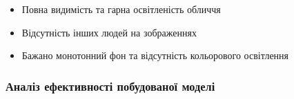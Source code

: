 \documentclass[11pt]{article}
\providecommand{\tightlist}{%
      \setlength{\itemsep}{0pt}\setlength{\parskip}{0pt}}
\begin{document}
\begin{itemize}
\tightlist
\item
  Повна видимість та гарна освітленість обличчя
\item
  Відсутність інших людей на зображеннях
\item
  Бажано монотонний фон та відсутність кольорового освітлення
\end{itemize}

    \hypertarget{ux430ux43dux430ux43bux456ux437-ux435ux444ux435ux43aux442ux438ux432ux43dux43eux441ux442ux456-ux43fux43eux431ux443ux434ux43eux432ux430ux43dux43eux457-ux43cux43eux434ux435ux43bux456}{%
\subsubsection{Аналіз ефективності побудованої
моделі}\label{ux430ux43dux430ux43bux456ux437-ux435ux444ux435ux43aux442ux438ux432ux43dux43eux441ux442ux456-ux43fux43eux431ux443ux434ux43eux432ux430ux43dux43eux457-ux43cux43eux434ux435ux43bux456}}
\end{document}
